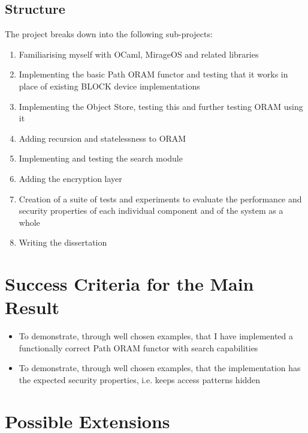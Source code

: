 \documentclass[12pt,a4paper,twoside]{article}
\begin{document}
\subsection*{Structure}

The project breaks down into the following sub-projects:

\begin{enumerate}

\item Familiarising myself with OCaml, MirageOS and related libraries

\item Implementing the basic Path ORAM functor and testing that it works in place of existing BLOCK device implementations

\item Implementing the Object Store, testing this and further testing ORAM using it

\item Adding recursion and statelessness to ORAM 

\item Implementing and testing the search module

\item Adding the encryption layer

\item Creation of a suite of tests and experiments to evaluate the performance and security properties of each individual component and of the system as a whole

\item Writing the dissertation

\end{enumerate}

\section*{Success Criteria for the Main Result}

\begin{itemize}
	\item To demonstrate, through well chosen examples, that I have implemented a functionally correct Path ORAM functor with search capabilities
	\item To demonstrate, through well chosen examples, that the implementation has the expected security properties, i.e. keeps access patterns hidden
\end{itemize}


\section*{Possible Extensions}
\end{document}
